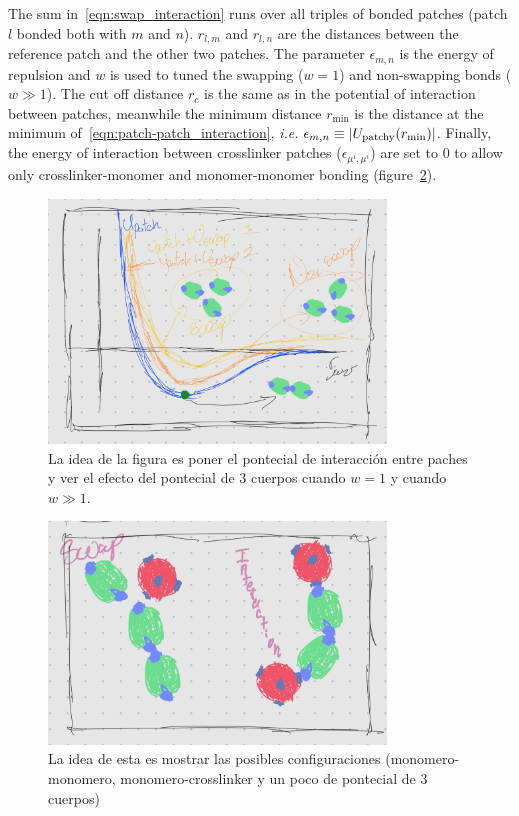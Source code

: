 \documentclass[../main.tex]{subfiles}
\begin{document}
The sum in~\eqref{eqn:swap_interaction} runs over all triples of bonded patches (patch $l$ bonded both with $m$ and $n$).
$r_{l,m}$ and $r_{l,n}$ are the distances between the reference patch and the other two patches.
The parameter $\epsilon_{m,n}$ is the energy of repulsion and $w$ is used to tuned the swapping ($w=1$) and non-swapping bonds ($w\gg1$). 
The cut off distance $r_c$ is the same as in the potential of interaction between patches, meanwhile the minimum distance $r_{\min}$ is the distance at the minimum of~\eqref{eqn:patch-patch_interaction}, \textit{i.e.} $\epsilon_{m,n}\equiv\abs{U_{\mathrm{patchy}}(r_{\min})}$.
Finally, the energy of interaction between crosslinker patches ($\epsilon_{\mu^i,\mu^i}$) are set to $0$ to allow only crosslinker-monomer and monomer-monomer bonding (figure~\ref{fig:intento2}).

\begin{figure}[ht]
    \centering 
    \includegraphics[width=0.8\textwidth]{../../imgs/potentia-interactions.jpg}
    \caption{La idea de la figura es poner el pontecial de interacción entre paches y ver el efecto del pontecial de 3 cuerpos cuando $w=1$ y cuando $w\gg1$.}\label{fig:intento}
\end{figure}


\begin{figure}[ht]
    \centering 
    \includegraphics[width=0.8\textwidth]{../../imgs/patches-interaction.jpg}
    \caption{La idea de esta es mostrar las posibles configuraciones (monomero-monomero, monomero-crosslinker y un poco de pontecial de 3 cuerpos)}\label{fig:intento2}
\end{figure}
\end{document}
